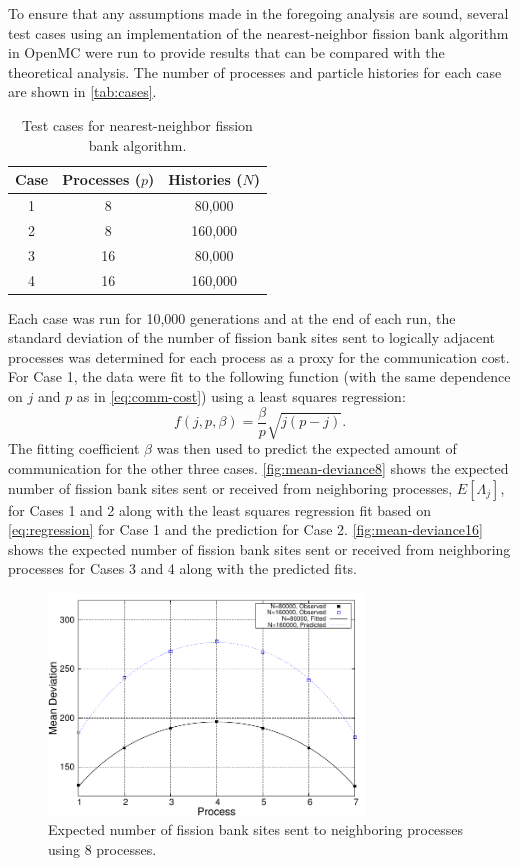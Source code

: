 To ensure that any assumptions made in the foregoing analysis are sound, several
test cases using an implementation of the nearest-neighbor fission bank
algorithm in OpenMC were run to provide results that can be compared with the
theoretical analysis. The number of processes and particle histories for each
case are shown in \autoref{tab:cases}.
\begin{table}[ht!]
  \centering
  \caption{Test cases for nearest-neighbor fission bank algorithm.}
  \label{tab:cases}
  \begin{tabular}{ c c c }
    \toprule
    Case & Processes ($p$) & Histories ($N$) \\ 
    \midrule
    1 & 8 & 80,000 \\
    2 & 8 & 160,000 \\
    3 & 16 & 80,000 \\
    4 & 16 & 160,000 \\
    \bottomrule
  \end{tabular}
\end{table}
Each case was run for 10,000 generations and at the end of each run, the
standard deviation of the number of fission bank sites sent to logically
adjacent processes was determined for each process as a proxy for the
communication cost. For Case 1, the data were fit to the following function
(with the same dependence on $j$ and $p$ as in \eqref{eq:comm-cost}) using a
least squares regression:
\begin{equation}
  \label{eq:regression}
  f(j,p,\beta) = \frac{\beta}{p} \sqrt{j(p-j)}.
\end{equation}
The fitting coefficient $\beta$ was then used to predict the expected amount of
communication for the other three cases. \autoref{fig:mean-deviance8} shows the
expected number of fission bank sites sent or received from neighboring
processes, $E \left [ \Lambda_j \right ]$, for Cases 1 and 2 along with the
least squares regression fit based on \eqref{eq:regression} for Case 1 and the
prediction for Case 2. \autoref{fig:mean-deviance16} shows the expected number
of fission bank sites sent or received from neighboring processes for Cases 3
and 4 along with the predicted fits.
\begin{figure}[ht!]
  \centering
  \includegraphics[width=0.75\textwidth]{figures/ch3/mean_deviance/plot8.pdf}
  \caption{Expected number of fission bank sites sent to neighboring processes
    using 8 processes.}
  \label{fig:mean-deviance8}
\end{figure}
